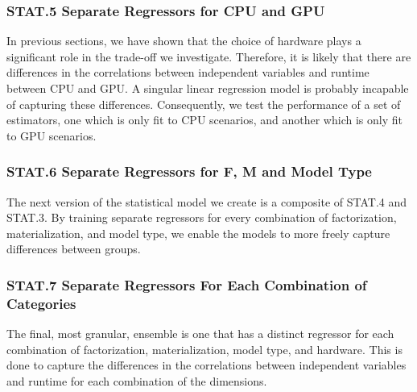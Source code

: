\subsubsection*{STAT.5 Separate Regressors for CPU and GPU}
In previous sections, we have shown that the choice of hardware plays a significant role in the trade-off we investigate. Therefore, it is likely that there are differences in the correlations between independent variables and runtime between CPU and GPU. A singular linear regression model is probably incapable of capturing these differences. Consequently, we test the performance of a set of estimators, one which is only fit to CPU scenarios, and another which is only fit to GPU scenarios.

\subsubsection*{STAT.6 Separate Regressors for F, M and Model Type}
The next version of the statistical model we create is a composite of STAT.4 and STAT.3. By training separate regressors for every combination of factorization, materialization, and model type, we enable the models to more freely capture differences between groups.

\subsubsection*{STAT.7 Separate Regressors For Each Combination of Categories}
The final, most granular, ensemble is one that has a distinct regressor for each combination of factorization, materialization, model type, and hardware. This is done to capture the differences in the correlations between independent variables and runtime for each combination of the dimensions.


